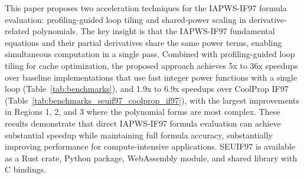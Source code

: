 \documentclass{article}
\begin{document}
This paper proposes two acceleration techniques for the IAPWS-IF97 formula evaluation: profiling-guided loop tiling and
shared-power scaling in derivative-related polynomials. The key insight is that the IAPWS-IF97 fundamental equations and their partial derivatives share the same power terms, 
enabling simultaneous computation in a single pass. Combined with profiling-guided loop tiling for cache optimization, 
the proposed approach achieves 5x to 36x speedups over baseline implementations that use fast integer power functions with a single loop (Table~\ref{tab:benchmarks}), and 1.9x to 6.9x speedups over CoolProp IF97 (Table~\ref{tab:benchmarks_seuif97_coolprop_if97}), with the largest improvements in Regions 1, 2, and 3 where the polynomial forms are most complex. 
These results demonstrate that direct IAPWS-IF97 formula evaluation can achieve substantial speedup while maintaining full formula accuracy, substantially improving performance for compute-intensive applications. SEUIF97 is available as a Rust crate, Python package, WebAssembly module, and shared library with C bindings.
\end{document}
